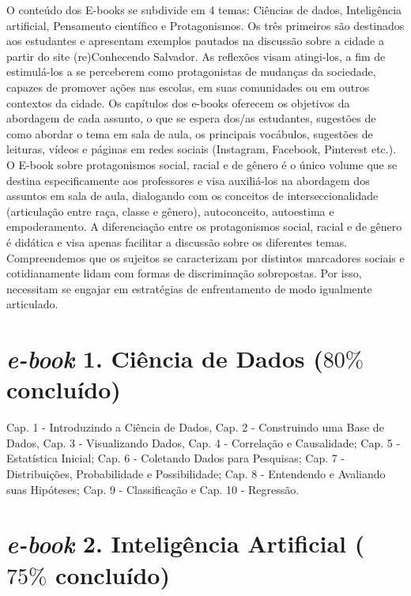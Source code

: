 \documentclass[
]{book}
\begin{document}
O conteúdo dos E-books se subdivide em 4 temas: Ciências de dados, Inteligência artificial, Pensamento científico e Protagonismos. Os três primeiros são destinados aos estudantes e apresentam exemplos pautados na discussão sobre a cidade a partir do site (re)Conhecendo Salvador. As reflexões visam atingi-los, a fim de estimulá-los a se perceberem como protagonistas de mudanças da sociedade, capazes de promover ações nas escolas, em suas comunidades ou em outros contextos da cidade. Os capítulos dos e-books oferecem os objetivos da abordagem de cada assunto, o que se espera dos/as estudantes, sugestões de como abordar o tema em sala de aula, os principais vocábulos, sugestões de leituras, vídeos e páginas em redes sociais (Instagram, Facebook, Pinterest etc.).
O E-book sobre protagonismos social, racial e de gênero é o único volume que se destina especificamente aos professores e visa auxiliá-los na abordagem dos assuntos em sala de aula, dialogando com os conceitos de interseccionalidade (articulação entre raça, classe e gênero), autoconceito, autoestima e empoderamento. A diferenciação entre os protagonismos social, racial e de gênero é didática e visa apenas facilitar a discussão sobre os diferentes temas. Compreendemos que os sujeitos se caracterizam por distintos marcadores sociais e cotidianamente lidam com formas de discriminação sobrepostas. Por isso, necessitam se engajar em estratégias de enfrentamento de modo igualmente articulado.

\hypertarget{e-book-1.-ciuxeancia-de-dados-80-concluuxeddo}{%
\section{\texorpdfstring{\emph{e-book} 1. Ciência de Dados (\(80\%\) concluído)}{e-book 1. Ciência de Dados (80\textbackslash\% concluído)}}\label{e-book-1.-ciuxeancia-de-dados-80-concluuxeddo}}

Cap. 1 - Introduzindo a Ciência de Dados, Cap. 2 - Construindo uma Base de Dados, Cap. 3 - Visualizando Dados, Cap. 4 - Correlação e Causalidade; Cap. 5 - Estatística Inicial; Cap. 6 - Coletando Dados para Pesquisas; Cap. 7 - Distribuições, Probabilidade e Possibilidade; Cap. 8 - Entendendo e Avaliando suas Hipóteses; Cap. 9 - Classificação e Cap. 10 - Regressão.

\hypertarget{e-book-2.-inteliguxeancia-artificial-75-concluuxeddo}{%
\section{\texorpdfstring{\emph{e-book} 2. Inteligência Artificial (\(75\%\) concluído)}{e-book 2. Inteligência Artificial (75\textbackslash\% concluído)}}\label{e-book-2.-inteliguxeancia-artificial-75-concluuxeddo}}
\end{document}
